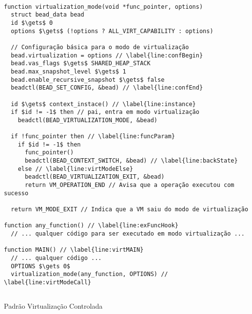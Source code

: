\begin{pseudocode}
\begin{lstlisting}[language=pseudocode, style=pseudocode]

function virtualization_mode(void *func_pointer, options)
  struct bead_data bead
  id $\gets$ 0
  options $\gets$ (!options ? ALL_VIRT_CAPABILITY : options)

  // Configuração básica para o modo de virtualização
  bead.virtualization = options // \label{line:confBegin}
  bead.vas_flags $\gets$ SHARED_HEAP_STACK
  bead.max_snapshot_level $\gets$ 1
  bead.enable_recursive_snapshot $\gets$ false
  beadctl(BEAD_SET_CONFIG, &bead) // \label{line:confEnd}

  id $\gets$ context_instace() // \label{line:instance}
  if $id != -1$ then // pai, entra em modo virtualização
    beadctl(BEAD_VIRTUALIZATION_MODE, &bead)

  if !func_pointer then // \label{line:funcParam}
    if $id != -1$ then
      func_pointer()
      beadctl(BEAD_CONTEXT_SWITCH, &bead) // \label{line:backState}
    else // \label{line:virtModeElse}
      beadctl(BEAD_VIRTUALIZATION_EXIT, &bead)
      return VM_OPERATION_END // Avisa que a operação executou com sucesso

  return VM_MODE_EXIT // Indica que a VM saiu do modo de virtualização

function any_function() // \label{line:exFuncHook}
  // ... qualquer código para ser executado em modo virtualização ...      

function MAIN() // \label{line:virtMAIN}
  // ... qualquer código ...
  OPTIONS $\gets 0$
  virtualization_mode(any_function, OPTIONS) // \label{line:virtModeCall}
  
\end{lstlisting}

  \label{alg:virtMode}
  \caption{Padrão Virtualização Controlada}
\end{pseudocode}
